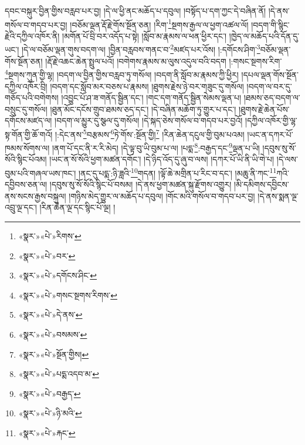 དབང་བསྐུར་བྱིན་གྱིས་བརླབ་པར་བྱ། །དེ་ལ་ཕྱི་ནང་མཆོད་པ་དབུལ། །བསྟོད་པ་དག་ཀྱང་དེ་བཞིན་ནོ། །དེ་ནས་གསོལ་བ་གདབ་པར་བྱ། །བཅོམ་ལྡན་རྡོ་རྗེ་གོས་སྔོན་ཅན། །རིག་\footnote{«སྣར་»«པེ་»རིགས་}སྔགས་རྒྱལ་ལ་ཕྱག་འཚལ་ལོ། །བདག་གི་སྙིང་རྗེའི་དཀྱིལ་འཁོར་ནི། །མགོན་པོ་བྲི་བར་འདོད་པ་སྟེ། །སློབ་མ་རྣམས་ལ་ཕན་ཕྱིར་དང་། །ཁྱེད་ལ་མཆོད་པའི་དོན་དུ་ཡང་། །དེ་ལ་བཅོམ་ལྡན་གུས་བདག་ལ། །བྱིན་བརླབས་གནང་བ་\footnote{«སྣར་»«པེ་»བར་}མཛད་པར་འོས། །:དགོངས་ཤིག་\footnote{«སྣར་»«པེ་»དགོངས་ཤིང་}བཅོམ་ལྡན་གོས་སྔོན་ཅན། །རྡོ་རྗེ་འཆང་ཆེན་སྤྲུལ་པའོ། །བགེགས་རྣམས་མ་ལུས་འདུལ་བའི་བདག །:གསང་སྔགས་རིག་\footnote{«སྣར་»«པེ་»གསང་སྔགས་རིགས་}སྔགས་ཀུན་གྱི་ལྷ། །བདག་ལ་བྱིན་གྱིས་བརླབ་ཏུ་གསོལ། །བདག་ནི་སློབ་མ་རྣམས་ཀྱི་ཕྱིར། །དཔལ་ལྡན་གོས་སྔོན་དཀྱིལ་འཁོར་བྲི། །བདག་དང་སློབ་མར་བཅས་པ་རྣམས། །ཐུགས་རྗེས་ཉེ་བར་གཟུང་དུ་གསོལ། །བདག་ལ་བར་དུ་གཅོད་པའི་བགེགས། །འབྱུང་པོ་ཤ་ཟ་གནོད་སྦྱིན་དང་། །གང་དག་གནོད་སྦྱིན་སེམས་ལྡན་པ། །ཐམས་ཅད་བདག་ལ་བསྲུང་དུ་གསོལ། །ཐུན་མོང་དངོས་གྲུབ་ཐམས་ཅད་དང་། །དེ་བཞིན་མཆོག་ཏུ་གྱུར་པ་དང་། །ཐུགས་རྗེ་ཆེན་པོས་དགོངས་མཛད་ལ། །བདག་ལ་མྱུར་དུ་སྩལ་དུ་གསོལ། །དེ་སྐད་ཅེས་གསོལ་བ་གདབ་པར་བྱའོ། །དཀྱིལ་འཁོར་གྱི་ལྷ་སྟ་གོན་གྱི་ཆོ་གའོ། །:དེང་ནས་\footnote{«སྣར་»«པེ་»དེ་ནས་}བརྩམས་\footnote{«སྣར་»«པེ་»བསམས་}ཏེ་གོས་:སྔོན་གྱི།\footnote{«སྣར་»«པེ་»སྔོན་གྱིས།} །རིན་ཆེན་དངུལ་གྱི་བུམ་པའམ། །ཡང་ན་དཀར་པོ་ཁམས་སོགས་ལ། །ནག་པོ་དང་ནི་ར་རི་མེད། །དེ་ལྟ་བུ་ཡི་བུམ་པ་ལ། །པདྨ་\footnote{«སྣར་»«པེ་»པདྨ་འདབ་མ་}:བརྒྱད་དང་\footnote{«སྣར་»«པེ་»བརྒྱད་}ལྡན་པ་ཡི། །དབུས་སུ་སོ་སོའི་སྙིང་པོའམ། །ཡང་ན་སོ་སོའི་ཕྱག་མཚན་དགོང་། །དེ་ཉིད་འོད་དུ་ཞུ་བ་ལས། །དཀར་པོ་ཡི་ནི་ཡི་གེ་པ། །དེ་ལས་བུམ་པའི་གཞལ་ཡས་ཁང་། །ནང་དུ་པདྨ་:ཉི་ཟླའི་\footnote{«སྣར་»«པེ་»ཉི་མའི་}གདན། །ལྟོ་ཆེ་མགྲིན་པ་རིང་བ་དང་། །མཆུ་ནི་ཀང་\footnote{«སྣར་»«པེ་»རྐང་}ཀའི་དབྱིབས་ཅན་ལ། །དབུས་སུ་སོ་སོའི་སྙིང་པོ་བསམ། །དེ་ནས་ཕྱག་མཚན་སྐུ་རྫོགས་འགྱུར། །མི་དམིགས་དབྱིངས་ནས་སངས་རྒྱས་བསྐུལ། །གཉིས་མེད་གྱུར་ལ་མཆོད་པ་དབུལ། །གོང་མའི་གསོལ་བ་གདབ་པར་བྱ། །དེ་ནས་སྨན་ལྔ་འབྲུ་ལྔ་དང་། །རིན་ཆེན་ལྔ་དང་སྙིང་པོ་ལྔ། །
